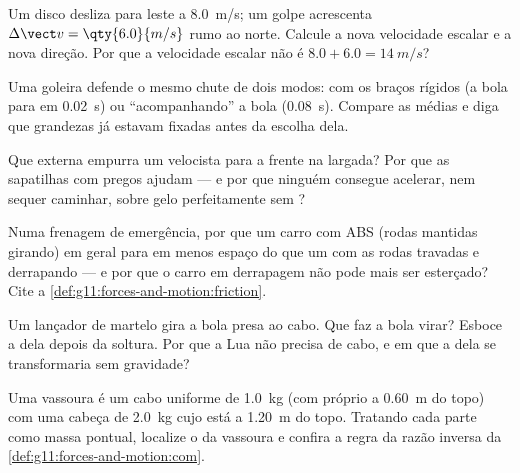 \begin{exercise}[$\star\star$]\label{exo:g11:forces-and-motion:7}
Um disco desliza para leste a \qty{8.0}{m/s}; um golpe acrescenta
$\Delta \vect v = \qty{6.0}{m/s}$ rumo ao norte. Calcule a nova
velocidade escalar e a nova direção. Por que a velocidade escalar não é
$8.0 + 6.0 = \qty{14}{m/s}$?
\end{exercise}

\begin{exercise}[$\star\star$]\label{exo:g11:forces-and-motion:8}
Uma goleira defende o mesmo chute de dois modos: com os braços rígidos (a
bola para em \qty{0.02}{s}) ou ``acompanhando'' a bola (\qty{0.08}{s}).
Compare as  médias e diga que grandezas já estavam fixadas antes da
escolha dela.
\end{exercise}

\begin{exercise}[$\star\star$]\label{exo:g11:forces-and-motion:9}
Que  externa empurra um velocista para a frente na largada? Por que
as sapatilhas com pregos ajudam --- e por que ninguém consegue acelerar,
nem sequer caminhar, sobre gelo perfeitamente sem ?
\end{exercise}

\begin{exercise}[$\star\star$]\label{exo:g11:forces-and-motion:10}
Numa frenagem de emergência, por que um carro com ABS (rodas mantidas
girando) em geral para em menos espaço do que um com as rodas travadas e
derrapando --- e por que o carro em derrapagem não pode mais ser
esterçado? Cite a \cref{def:g11:forces-and-motion:friction}.
\end{exercise}

\begin{exercise}[$\star\star$]\label{exo:g11:forces-and-motion:11}
Um lançador de martelo gira a bola presa ao cabo. Que  faz a bola
virar? Esboce a  dela depois da soltura. Por que a Lua não
precisa de cabo, e em que a  dela se transformaria sem
gravidade?
\end{exercise}

\begin{exercise}[$\star\star\star$]\label{exo:g11:forces-and-motion:12}
Uma vassoura é um cabo uniforme de \qty{1.0}{kg} (com 
próprio a \qty{0.60}{m} do topo) com uma cabeça de \qty{2.0}{kg} cujo
 está a \qty{1.20}{m} do topo. Tratando cada parte como
massa pontual, localize o  da vassoura e confira a regra
da razão inversa da \cref{def:g11:forces-and-motion:com}.
\end{exercise}

